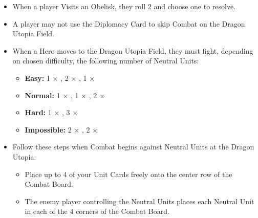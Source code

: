 \begin{multicols*}{2}
\begin{itemize}
  \item When a player Visits an Obelisk, they roll 2  and choose one to resolve.
  \item A player may not use the Diplomacy Card to skip Combat on the Dragon Utopia Field.
  \vspace*{\fill}\columnbreak
  \item When a Hero moves to the Dragon Utopia Field, they must fight, depending on chosen difficulty, the following number of Neutral Units:
  \begin{itemize}
    \item \textbf{Easy:} 1 × , 2 × , 1 × 
    \item \textbf{Normal:} 1 × , 1 × , 2 × 
    \item \textbf{Hard:} 1 × , 3 × 
    \item \textbf{Impossible:}  2 × , 2 × 
  \end{itemize}
  \item Follow these steps when Combat begins against Neutral Units at the Dragon Utopia:
  \begin{itemize}
    \item Place up to 4 of your Unit Cards freely onto the center row of the Combat Board.
    \item The enemy player controlling the Neutral Units places each Neutral Unit in each of the 4 corners of the Combat Board.
  \end{itemize}
\end{itemize}


\end{multicols*}
